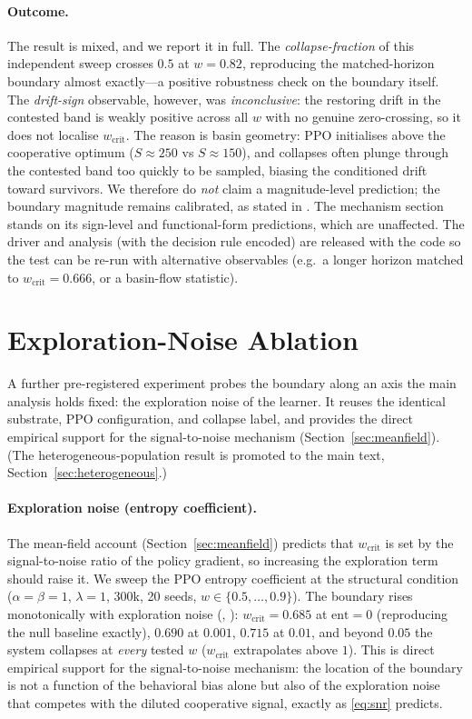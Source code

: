 \documentclass[letterpaper]{article}
\theoremstyle{plain}
\newcommand{\wcrit}{w_{\mathrm{crit}}}
\begin{document}
\paragraph{Outcome.} The result is mixed, and we report it in full. The
\emph{collapse-fraction} of this independent sweep crosses $0.5$ at
$w=0.82$, reproducing the matched-horizon boundary almost exactly---a
positive robustness check on the boundary itself. The \emph{drift-sign}
observable, however, was \emph{inconclusive}: the restoring drift in the
contested band is weakly positive across all $w$ with no genuine
zero-crossing, so it does not localise $\wcrit$. The reason is basin
geometry: PPO initialises above the cooperative optimum ($S{\approx}250$ vs
$S{\approx}150$), and collapses often plunge through the contested band too
quickly to be sampled, biasing the conditioned drift toward survivors. We
therefore do \emph{not} claim a magnitude-level prediction; the boundary
magnitude remains calibrated, as stated in . The mechanism
section stands on its sign-level and functional-form predictions, which are
unaffected. The driver and analysis (with the decision rule encoded) are
released with the code so the test can be re-run with alternative
observables (e.g.\ a longer horizon matched to $\wcrit=0.666$, or a
basin-flow statistic).

\section{Exploration-Noise Ablation}
\label{sec:appendix_robustness2}

A further pre-registered experiment probes the boundary along an axis the main
analysis holds fixed: the exploration noise of the learner. It reuses the
identical substrate, PPO configuration, and collapse label, and provides the
direct empirical support for the signal-to-noise mechanism
(Section~\ref{sec:meanfield}). (The heterogeneous-population result is promoted
to the main text, Section~\ref{sec:heterogeneous}.)

\paragraph{Exploration noise (entropy coefficient).}
The mean-field account (Section~\ref{sec:meanfield}) predicts that $\wcrit$ is set by
the signal-to-noise ratio of the policy gradient, so increasing the exploration
term should raise it. We sweep the PPO entropy coefficient at the structural
condition ($\alpha{=}\beta{=}1$, $\lambda{=}1$, 300k, 20 seeds, $w\in\{0.5,
\ldots,0.9\}$). The boundary rises monotonically with exploration noise
(, ): $\wcrit = 0.685$ at $\text{ent}{=}0$
(reproducing the null baseline exactly), $0.690$ at $0.001$, $0.715$ at $0.01$,
and beyond $0.05$ the system collapses at \emph{every} tested $w$
($\wcrit$ extrapolates above $1$). This is direct empirical support for the
signal-to-noise mechanism: the location of the boundary is not a function of the
behavioral bias alone but also of the exploration noise that competes with the
diluted cooperative signal, exactly as \eqref{eq:snr} predicts.
\end{document}
